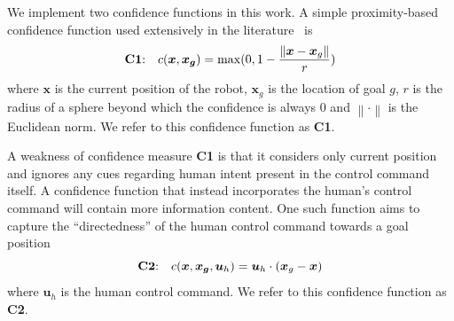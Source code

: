 \documentclass[conference]{IEEEtran}
\newcommand{\norm}[1]{\left\lVert#1\right\rVert}
\begin{document}
We implement two confidence functions in this work. A simple proximity-based confidence function used extensively in the literature~\cite{dragan2012assistive,dragan2012formalizing,dragan2013policy} is
\begin{equation*}\label{C1}
\textrm{\textbf{C1}:}~~~c(\boldsymbol{x}, \boldsymbol{x_g}) = \max(0, 1 - \frac{\norm{\boldsymbol{x} - \boldsymbol{x}_{g}}}{r})
\end{equation*}
where $\boldsymbol{x}$ is the current position of the robot, $\boldsymbol{x}_{g}$ is the location of goal $g$, $r$ is the radius of a sphere beyond which the confidence is always $0$ and $\norm{\cdot}$ is the Euclidean norm. We refer to this confidence function as \textbf{C1}. 

A weakness of confidence measure \textbf{C1} is that it considers only current position and ignores any cues regarding human intent present in the control command itself. A confidence function that instead incorporates the human's control command will contain more information content. One such function aims to capture the ``directedness'' of the human control command towards a goal position
\begin{equation*}\label{C2}
\textrm{\textbf{C2}:}~~~c({\boldsymbol{x},\boldsymbol{x_g}, \boldsymbol{u}_{h}}) = \boldsymbol{u}_h\cdot(\boldsymbol{x}_{g} - \boldsymbol{x})
\end{equation*}
where $\boldsymbol{u}_h$ is the human control command. We refer to this confidence function as \textbf{C2}. 
\end{document}
